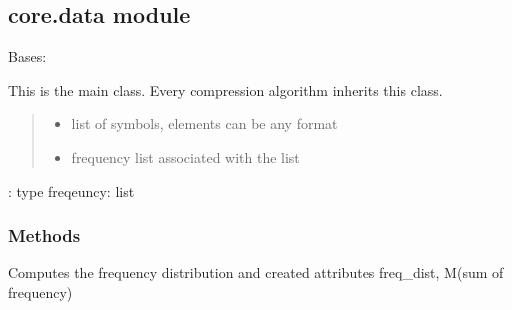 \documentclass[letterpaper,10pt,english]{sphinxmanual}
\begin{document}
\subsection{core.data module}
\label{\detokenize{core:module-core.data}}\label{\detokenize{core:core-data-module}}

\begin{fulllineitems}
\label{\detokenize{core:core.data.Data}}
\pysigstartsignatures
{}
\pysigstopsignatures
\sphinxAtStartPar
Bases: 

\sphinxAtStartPar
This is the main class. Every compression algorithm inherits this class.
\begin{quote}\begin{description}
\begin{itemize}
\item {} 
\sphinxAtStartPar
{} \textendash{} list of symbols, elements can be any format

\item {} 
\sphinxAtStartPar
{} \textendash{} frequency list associated with the list

\end{itemize}

\end{description}\end{quote}

\sphinxAtStartPar
: type freqeuncy: list


\subsubsection{Methods}
\label{\detokenize{core:methods}}\begin{description}
\sphinxAtStartPar
Computes the frequency distribution and created attributes freq\_dist, M(sum of frequency)


\end{description}
\end{fulllineitems}
\end{document}
